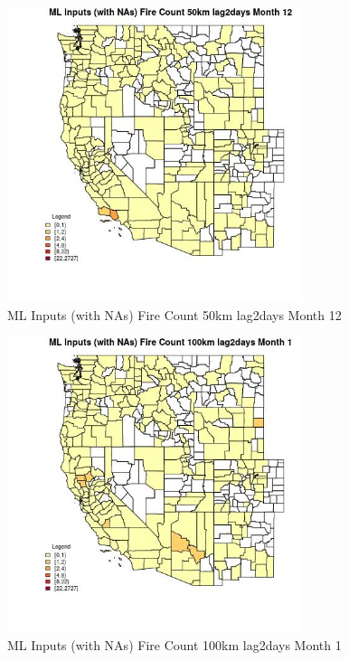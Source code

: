 \begin{figure} 
\centering  
\includegraphics[width=0.77\textwidth]{Code_Outputs/Report_ML_input_PM25_Step4_part_f_de_duplicated_aveswNAs_CountyFire_Count_50km_lag2daysmedianMonth12.jpg} 
\caption{\label{fig:Report_ML_input_PM25_Step4_part_f_de_duplicated_aveswNAsCountyFire_Count_50km_lag2daysmedianMonth12}ML Inputs (with NAs) Fire Count 50km lag2days Month 12} 
\end{figure} 
 

\clearpage 

\begin{figure} 
\centering  
\includegraphics[width=0.77\textwidth]{Code_Outputs/Report_ML_input_PM25_Step4_part_f_de_duplicated_aveswNAs_CountyFire_Count_100km_lag2daysmedianMonth1.jpg} 
\caption{\label{fig:Report_ML_input_PM25_Step4_part_f_de_duplicated_aveswNAsCountyFire_Count_100km_lag2daysmedianMonth1}ML Inputs (with NAs) Fire Count 100km lag2days Month 1} 
\end{figure} 
 

